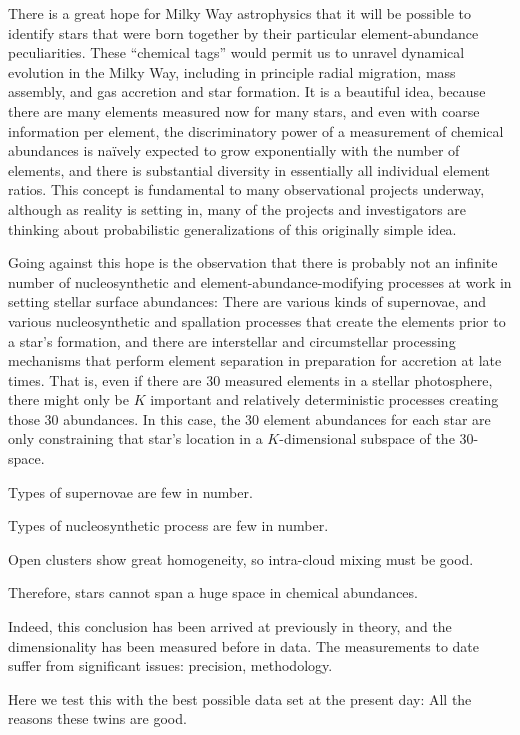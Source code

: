 \documentclass[letterpaper, modern]{aastex62}
\begin{document}
There is a great hope for Milky Way astrophysics that it will be possible
to identify stars that were born together by their particular element-abundance
peculiarities.
These ``chemical tags'' would permit us to unravel dynamical evolution in the
Milky Way, including in principle radial migration, mass assembly, and gas accretion and
star formation.
It is a beautiful idea, because there are many elements measured now for
many stars, and even with coarse information per element, the discriminatory
power of a measurement of chemical abundances is na\"ively expected to
grow exponentially with the number of elements, and there is substantial
diversity in essentially all individual element ratios.
This concept is fundamental to many observational projects underway, although
as reality is setting in, many of the projects and investigators are thinking
about probabilistic generalizations of this originally simple idea.

Going against this hope is the observation that there is probably not an infinite number
of nucleosynthetic and element-abundance-modifying processes at work in setting
stellar surface abundances:
There are various kinds of supernovae, and various nucleosynthetic and
spallation processes that create the elements prior to a star's formation,
and there are interstellar
and circumstellar processing mechanisms that perform element separation
in preparation for accretion at late times.
That is, even if there are 30 measured elements in a stellar photosphere,
there might only be $K$
important and relatively deterministic processes creating those 30 abundances.
In this case, the 30 element abundances for each star are only constraining that
star's location in a $K$-dimensional subspace of the 30-space.

Types of supernovae are few in number.

Types of nucleosynthetic process are few in number.

Open clusters show great homogeneity, so intra-cloud mixing must be good.

Therefore, stars cannot span a huge space in chemical abundances.

Indeed, this conclusion has been arrived at previously in theory, and
the dimensionality has been measured before in data. The measurements to
date suffer from significant issues: precision, methodology.

Here we test this with the best possible data set at the present day:
All the reasons these twins are good.
\end{document}
